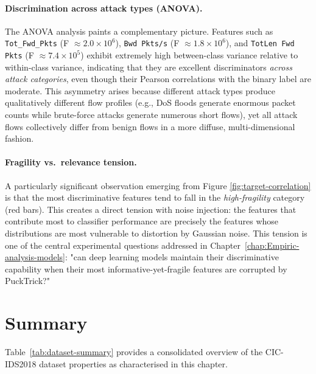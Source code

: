 \documentclass[../main.tex]{subfiles}
\begin{document}
\paragraph{Discrimination across attack types (ANOVA).}
The ANOVA analysis paints a complementary picture.  Features such as \texttt{Tot\_Fwd\_Pkts} (F $\approx 2.0 \times 10^6$), \texttt{Bwd Pkts/s} (F $\approx 1.8 \times 10^6$), and \texttt{TotLen Fwd Pkts} (F $\approx 7.4 \times 10^5$) exhibit extremely high between-class variance relative to within-class variance, indicating that they are excellent discriminators \emph{across attack categories}, even though their Pearson correlations with the binary label are moderate.  This asymmetry arises because different attack types produce qualitatively different flow profiles (e.g., DoS floods generate enormous packet counts while brute-force attacks generate numerous short flows), yet all attack flows collectively differ from benign flows in a more diffuse, multi-dimensional fashion.

\paragraph{Fragility vs.\ relevance tension.}
A particularly significant observation emerging from Figure \ref{fig:target-correlation} is that the most discriminative features tend to fall in the \emph{high-fragility} category (red bars).  This creates a direct tension with noise injection: the features that contribute most to classifier performance are precisely the features whose distributions are most vulnerable to distortion by Gaussian noise.  This tension is one of the central experimental questions addressed in Chapter~\ref{chap:Empiric-analysis-models}: "can deep learning models maintain their discriminative capability when their most informative-yet-fragile features are corrupted by PuckTrick?"

\section{Summary}
\label{sec:dataset-summary}

Table~\ref{tab:dataset-summary} provides a consolidated overview of the
CIC-IDS2018 dataset properties as characterised in this chapter.
\end{document}
